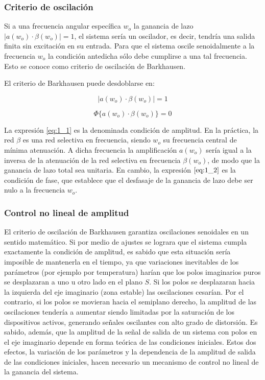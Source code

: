 \subsubsection{Criterio de oscilación}

Si a una frecuencia angular específica $w_o$ la ganancia de lazo $\mid a(w_o)\cdot \beta(w_o)\mid =1$, el sistema sería un oscilador, es decir, tendría una salida finita sin excitación en su entrada. Para que el sistema oscile senoidalmente a la frecuencia $w_o$ la condición antedicha sólo debe cumplirse a una tal frecuencia. Esto se conoce como criterio de oscilación de Barkhausen.

El criterio de Barkhausen puede desdoblarse en:

\begin{equation}
\label{eq:1_1}
\mid a(w_o)\cdot \beta (w_o)\mid =1  
\end{equation}

\begin{equation}
\label{eq:1_2}
\Phi \{a(w_o)\cdot \beta (w_o)\} = 0  
\end{equation}

La expresión \ref{eq:1_1} es la denominada condición de amplitud. En la práctica, la red $\beta$ es una red selectiva en frecuencia, siendo $w_o$ su frecuencia central de mínima atenuación. A dicha frecuencia la amplificación $a(w_o)$ sería igual a la inversa de la atenuación de la red selectiva en frecuencia $\beta (w_o)$, de modo que la ganancia de lazo total sea unitaria. En cambio, la expresión $\ref{eq:1_2}$ es la condición de fase, que establece que el desfasaje de la ganancia de lazo debe ser nulo a la frecuencia $w_o$.

\subsubsection{Control no lineal de amplitud}

El criterio de oscilación de Barkhausen garantiza oscilaciones senoidales en un sentido matemático. Si por medio de ajustes se lograra que el sistema cumpla exactamente la condición de amplitud, es sabido que esta situación sería imposible de mantenerla en el tiempo, ya que variaciones inevitables de los parámetros (por ejemplo por temperatura) harían que los polos imaginarios puros se desplazaran a uno u otro lado en el plano $S$. Si los polos se desplazaran hacia la izquierda del eje imaginario (zona estable) las oscilaciones cesarían. Por el contrario, si los polos se movieran hacia el semiplano derecho, la amplitud de las oscilaciones tendería a aumentar siendo limitadas por la saturación de los dispositivos activos, generando señales oscilantes con alto grado de distorsión. Es sabido, además, que la amplitud de la señal de salida de un sistema con polos en el eje imaginario depende en forma teórica de las condiciones iniciales. Estos dos efectos, la variación de los parámetros y la dependencia de la amplitud de salida de las condiciones iniciales, hacen necesario un mecanismo de control no lineal de la ganancia del sistema.

